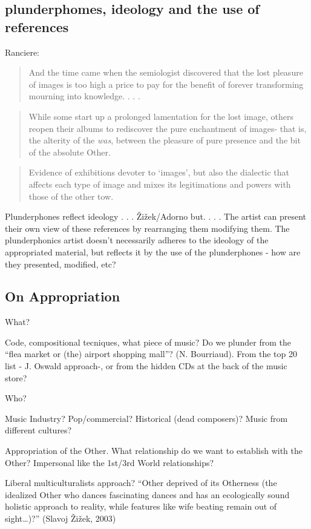 \subsection{plunderphomes, ideology and the use of references}

Ranciere: 
\begin{quote}
And the time came when the semiologist discovered that the lost pleasure of images is too high a price to pay for the benefit of forever transforming mourning into knowledge. . . .
\end{quote}
\begin{quote}
While some start up a prolonged lamentation for the lost image, others reopen their albums to rediscover the pure enchantment of images- that is, the alterity of the \emph{was}, between the pleasure of pure presence and the bit of the absolute Other.
\end{quote}
\begin{quote}
Evidence of exhibitions devoter to `images', but also the dialectic that affects each type of image and mixes its legitimations and powers with those of the other tow.
\end{quote}
Plunderphones reflect ideology . . . \v{Z}i\v{z}ek/Adorno but. . . . The artist can present their own view of these references by rearranging them modifying them. The plunderphonics artist doesn't necessarily adheres to the ideology of the appropriated material, but reflects it by the use of the plunderphones - how are they presented, modified, etc?  

\subsection{On Appropriation}

What? 

Code, compositional tecniques, what piece of music? 
Do we plunder from the ``flea market or (the) airport shopping mall''? (N. Bourriaud). From the top 20 list - J. Oswald approach-, or from the hidden CDs at the back of the music store?

Who?

Music Industry? Pop/commercial? Historical (dead composers)? Music from different cultures? 

Appropriation of the Other. What relationship do we want to establish with the Other? Impersonal like the 1st/3rd World relationships?

Liberal multiculturalists approach? ``Other deprived of its Otherness (the idealized Other who dances fascinating dances and has an ecologically sound holistic approach to reality, while features like wife beating remain out of sight…)?'' (Slavoj \v{Z}i\v{z}ek, 2003)

